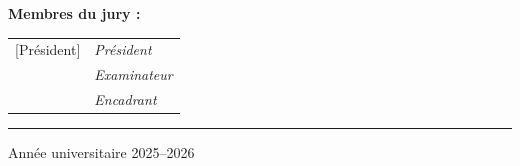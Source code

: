 \documentclass[12pt,a4paper,oneside]{report}
\begin{document}
\begin{titlepage}
\vspace{1.2cm}\textbf{Membres du jury :}\\[4pt]
\begin{tabular}{ll}
[Président] & \textit{Président}\\ [Examinateur] & \textit{Examinateur}\\ [Encadrant] & \textit{Encadrant}\\
\end{tabular}

\vfill{\color{lineGray}\rule{\textwidth}{0.5pt}}\vspace{0.3cm}
{\small Année universitaire 2025--2026\par}
\end{titlepage}



\tableofcontents
\listoffigures
\listoftables







\end{document}
